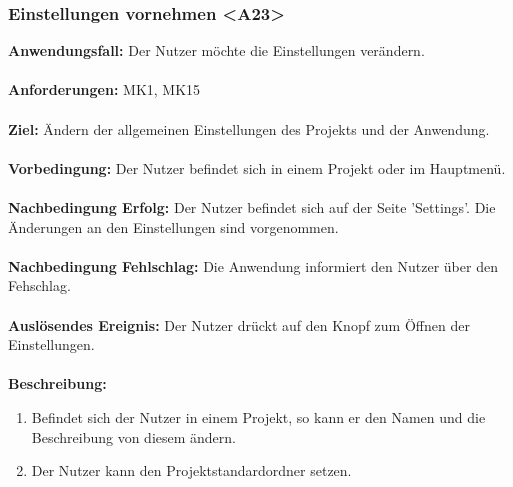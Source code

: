 \documentclass[parskip=full]{scrartcl} %
\begin{document}
\subsubsection*{Einstellungen vornehmen <A23>}
\textbf{Anwendungsfall:} Der Nutzer möchte die Einstellungen verändern.\\\\
\textbf{Anforderungen:} MK1, MK15\\\\
\textbf{Ziel:} Ändern der allgemeinen Einstellungen des Projekts und der Anwendung. \\\\
\textbf{Vorbedingung:} Der Nutzer befindet sich in einem Projekt oder im Hauptmenü.\\\\
\textbf{Nachbedingung Erfolg:} Der Nutzer befindet sich auf der Seite 'Settings'. Die Änderungen an den Einstellungen sind vorgenommen. \\\\
\textbf{Nachbedingung Fehlschlag:} Die Anwendung informiert den Nutzer über den Fehschlag. \\\\
\textbf{Auslösendes Ereignis:} Der Nutzer drückt auf den Knopf zum Öffnen der Einstellungen. \\\\
\textbf{Beschreibung:}
\begin{enumerate}
    \item Befindet sich der Nutzer in einem Projekt, so kann er den Namen und die Beschreibung von diesem ändern.
    \item Der Nutzer kann den Projektstandardordner setzen.
\end{enumerate}
\newpage
\end{document}
